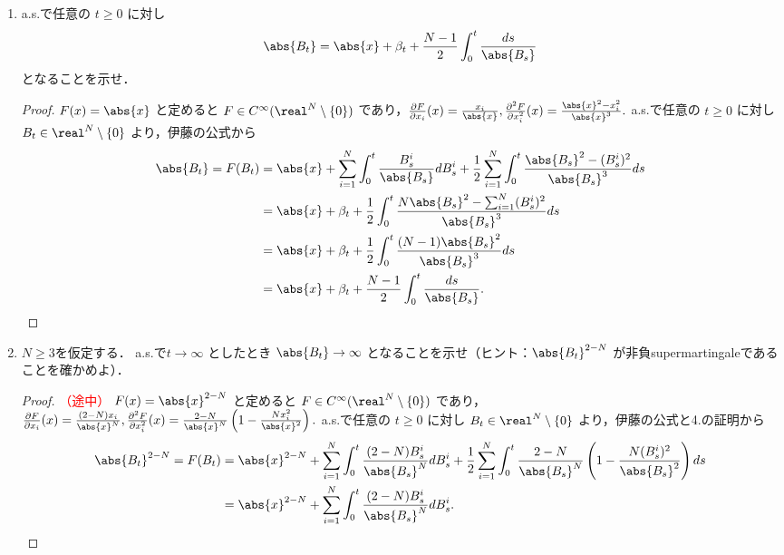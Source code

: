 \documentclass{jsarticle}
\begin{document}
\begin{enumerate}
    \item
    a.s.で任意の $t\ge0$ に対し
    $$
    \abs{B_t}
    = \abs{x}+\beta_t+\frac{N-1}{2}\int_0^t \frac{ds}{\abs{B_s}}
    $$
    となることを示せ．
    \begin{proof}
        $F(x)=\abs{x}$ と定めると $F\in C^\infty(\real^N\setminus\{0\})$ であり，$\frac{\partial F}{\partial x_i}(x)=\frac{x_i}{\abs{x}}, \frac{\partial^2 F}{\partial x_i^2}(x)=\frac{\abs{x}^2-x_i^2}{\abs{x}^3}.$
        a.s.で任意の $t\ge0$ に対し $B_t\in\real^N\setminus\{0\}$ より，伊藤の公式から
        \begin{align}
            \abs{B_t}
            = F(B_t)
            &= \abs{x}
            + \sum_{i=1}^{N}\int_0^t \frac{B_s^i}{\abs{B_s}}dB_s^i
            + \frac{1}{2}\sum_{i=1}^{N}\int_0^t \frac{\abs{B_s}^2-(B_s^i)^2}{\abs{B_s}^3}ds \\
            &= \abs{x}
            + \beta_t
            + \frac{1}{2}\int_0^t \frac{N\abs{B_s}^2-\sum_{i=1}^{N}(B_s^i)^2}{\abs{B_s}^3}ds \\
            &= \abs{x}
            + \beta_t
            + \frac{1}{2}\int_0^t \frac{(N-1)\abs{B_s}^2}{\abs{B_s}^3}ds \\
            &= \abs{x}
            + \beta_t
            + \frac{N-1}{2}\int_0^t \frac{ds}{\abs{B_s}}.
        \end{align}
    \end{proof}
    
    \item
    $N\ge3$を仮定する．
    a.s.で$t\to\infty$ としたとき $\abs{B_t}\to\infty$ となることを示せ（ヒント：$\abs{B_t}^{2-N}$ が非負supermartingaleであることを確かめよ）．
    \begin{proof}\textcolor{red}{（途中）}
        $F(x)=\abs{x}^{2-N}$ と定めると $F\in C^\infty(\real^N\setminus\{0\})$ であり，$\frac{\partial F}{\partial x_i}(x)=\frac{(2-N)x_i}{\abs{x}^N}, \frac{\partial^2 F}{\partial x_i^2}(x)=\frac{2-N}{\abs{x}^N}\left(1-\frac{Nx_i^2}{\abs{x}^2}\right).$
        a.s.で任意の $t\ge0$ に対し $B_t\in\real^N\setminus\{0\}$ より，伊藤の公式と4.の証明から
        \begin{align}
            \abs{B_t}^{2-N}
            = F(B_t)
            &= \abs{x}^{2-N}
            + \sum_{i=1}^{N}\int_0^t \frac{(2-N)B_s^i}{\abs{B_s}^N}dB_s^i
            + \frac{1}{2}\sum_{i=1}^{N}\int_0^t \frac{2-N}{\abs{B_s}^N}\left(1-\frac{N(B_s^i)^2}{\abs{B_s}^2}\right)ds \\
            &= \abs{x}^{2-N}
            + \sum_{i=1}^{N}\int_0^t \frac{(2-N)B_s^i}{\abs{B_s}^N}dB_s^i.
        \end{align}


\end{proof}
\end{enumerate}
\end{document}
